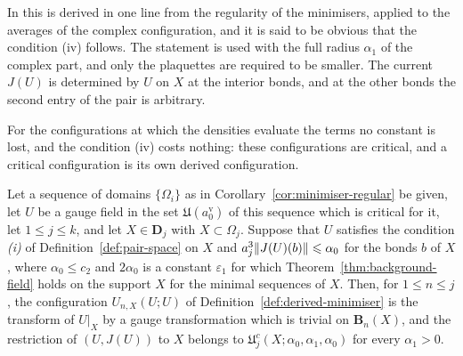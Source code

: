 \documentclass[11pt]{preprint}
\DeclarePairedDelimiter{\norm}{\lVert}{\rVert}
\numberwithin{equation}{section}
\begin{document}
In \cite[(1.17), p.~263]{BalabanRG1} this is derived in one line from the regularity of the minimisers, applied to the averages of the complex configuration, and it is said to be obvious that the condition (iv) follows. The statement is used with the full radius $\alpha_1$ of the complex part, and only the plaquettes are required to be smaller. The current $J(U)$ is determined by $U$ on $X$ at the interior bonds, and at the other bonds the second entry of the pair is arbitrary.

For the configurations at which the densities evaluate the terms no constant is lost, and the condition (iv) costs nothing: these configurations are critical, and a critical configuration is its own derived configuration.

\begin{lemma}\label{lem:critical-membership}
Let a sequence of domains $\{ \Omega_i \}$ as in Corollary~\ref{cor:minimiser-regular} be given, let $U$ be a gauge field in the set $\mathfrak U(a^{\mathrm v}_0)$ of this sequence which is critical for it, let $1 \leqslant j \leqslant k$, and let $X \in \mathbf D_j$ with $X \subset \Omega_j$. Suppose that $U$ satisfies the condition \emph{(i)} of Definition~\ref{def:pair-space} on $X$ and $a_j^3\norm{J(U)(b)} \leqslant \alpha_0$ for the bonds $b$ of $X$, where $\alpha_0 \leqslant c_2$ and $2\alpha_0$ is a constant $\varepsilon_1$ for which Theorem~\ref{thm:background-field} holds on the support $X$ for the minimal sequences of $X$. Then, for $1 \leqslant n \leqslant j$, the configuration $U_{n,X}(U; U)$ of Definition~\ref{def:derived-minimiser} is the transform of $U|_X$ by a gauge transformation which is trivial on $\mathbf B_n(X)$, and the restriction of $(U, J(U))$ to $X$ belongs to $\mathfrak U^c_j(X; \alpha_0, \alpha_1, \alpha_0)$ for every $\alpha_1 > 0$.
\end{lemma}
\end{document}

